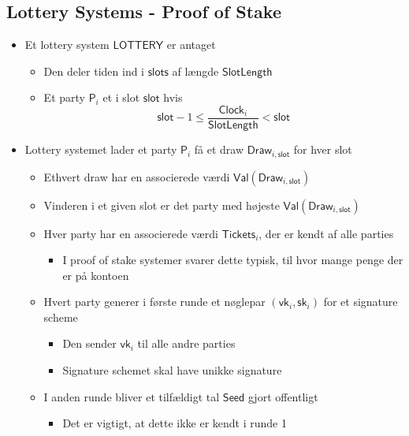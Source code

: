 \documentclass[a4, english]{article}
\begin{document}
\subsection{Lottery Systems - Proof of Stake}
\begin{itemize}
	\item Et lottery system $\mathsf{LOTTERY}$ er antaget
  \begin{itemize}
    \item Den deler tiden ind i $\mathsf{slots}$ af længde $\mathsf{SlotLength}$ 
    \item Et party $\mathsf{P}_i$ et i slot $\mathsf{slot}$ hvis
  \begin{equation*}
    \mathsf{slot}-1 \leq \frac{\mathsf{Clock}_i}{\mathsf{SlotLength}} < \mathsf{slot}
  \end{equation*}
  \end{itemize}
  \item Lottery systemet lader et party $\mathsf{P}_i$ få et draw $\mathsf{Draw}_{i,\mathsf{slot}}$ for hver slot
  \begin{itemize}
  	\item Ethvert draw har en associerede værdi $\mathsf{Val}(\mathsf{Draw}_{i,\mathsf{slot}})$  
    \item Vinderen i et given slot er det party med højeste $\mathsf{Val}(\mathsf{Draw}_{i,\mathsf{slot}})$
    \item Hver party har en associerede værdi $\mathsf{Tickets}_i$, der er kendt af alle parties
    \begin{itemize}
    	\item I proof of stake systemer svarer dette typisk, til hvor mange penge der er på kontoen 
    \end{itemize}
    \item Hvert party generer i første runde et nøglepar $(\mathsf{vk}_i, \mathsf{sk}_i)$ for et signature scheme
    \begin{itemize}
    	\item Den sender $\mathsf{vk}_i$ til alle andre parties
      \item Signature schemet skal have unikke signature  
    \end{itemize}
    \item I anden runde bliver et tilfældigt tal $\mathsf{Seed}$ gjort offentligt 
    \begin{itemize}
    	\item Det er vigtigt, at dette ikke er kendt i runde 1 
    \end{itemize}

\end{itemize}
\end{itemize}
\end{document}
